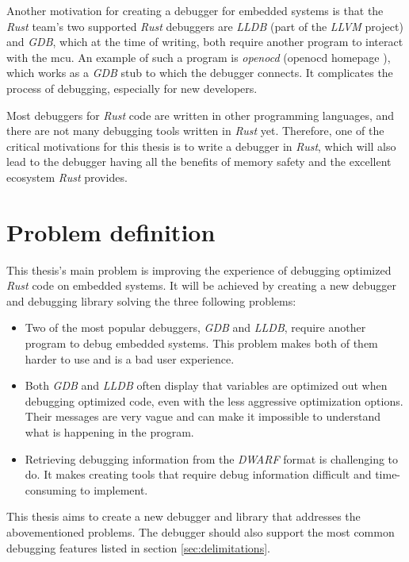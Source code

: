 Another motivation for creating a debugger for embedded systems is that the \emph{Rust} team's two supported \emph{Rust} debuggers are \emph{LLDB} (part of the \emph{LLVM} project) and \emph{GDB}, which at the time of writing, both require another program to interact with the \gls{mcu}.
An example of such a program is \emph{openocd} (openocd homepage \cite{openocd}), which works as a \emph{GDB} stub to which the debugger connects.
It complicates the process of debugging, especially for new developers.


Most debuggers for \emph{Rust} code are written in other programming languages, and there are not many debugging tools written in \emph{Rust} yet.
Therefore, one of the critical motivations for this thesis is to write a debugger in \emph{Rust}, which will also lead to the debugger having all the benefits of memory safety and the excellent ecosystem \emph{Rust} provides.


\section{Problem definition} \label{sec:problemDef}
This thesis's main problem is improving the experience of debugging optimized \emph{Rust} code on embedded systems.
It will be achieved by creating a new debugger and debugging library solving the three following problems:

\begin{itemize}
  \item Two of the most popular debuggers, \emph{GDB} and \emph{LLDB}, require another program to debug embedded systems.
This problem makes both of them harder to use and is a bad user experience.

\item Both \emph{GDB} and \emph{LLDB} often display that variables are optimized out when debugging optimized code, even with the less aggressive optimization options.
Their messages are very vague and can make it impossible to understand what is happening in the program.

\item Retrieving debugging information from the \emph{DWARF} format is challenging to do.
It makes creating tools that require debug information difficult and time-consuming to implement.
\end{itemize}

This thesis aims to create a new debugger and library that addresses the abovementioned problems.
The debugger should also support the most common debugging features listed in section \ref{sec:delimitations}.


